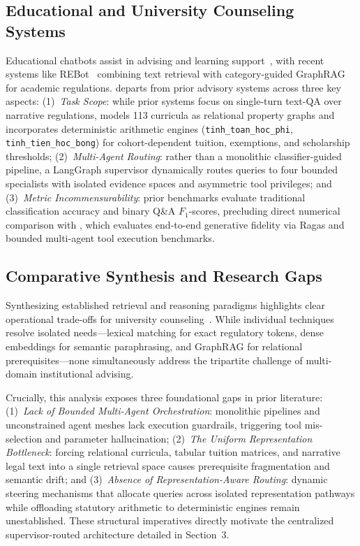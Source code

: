 \subsection{Educational and University Counseling Systems}
\label{sec:educational_counseling}

Educational chatbots assist in advising and learning support~\cite{wollny2021chatbots}, with recent systems like REBot~\cite{ma2025rebot} combining text retrieval with category-guided GraphRAG for academic regulations. \system{} departs from prior advisory systems across three key aspects: (1)~\emph{Task Scope}: while prior systems focus on single-turn text-QA over narrative regulations, \system{} models 113 curricula as relational property graphs and incorporates deterministic arithmetic engines (\texttt{tinh\_toan\_hoc\_phi}, \texttt{tinh\_tien\_hoc\_bong}) for cohort-dependent tuition, exemptions, and scholarship thresholds; (2)~\emph{Multi-Agent Routing}: rather than a monolithic classifier-guided pipeline, a LangGraph supervisor dynamically routes queries to four bounded specialists with isolated evidence spaces and asymmetric tool privileges; and (3)~\emph{Metric Incommensurability}: prior benchmarks evaluate traditional classification accuracy and binary Q\&A $F_1$-scores, precluding direct numerical comparison with \system{}, which evaluates end-to-end generative fidelity via Ragas and bounded multi-agent tool execution benchmarks.

\subsection{Comparative Synthesis and Research Gaps}
\label{sec:gaps}

Synthesizing established retrieval and reasoning paradigms highlights clear operational trade-offs for university counseling~\cite{cormack2009rrf,edge2024graphrag,jeong2024adaptiverag,karpukhin2020dpr,robertson2009bm25,schick2023toolformer,wu2023autogen,yao2023react}. While individual techniques resolve isolated needs---lexical matching for exact regulatory tokens, dense embeddings for semantic paraphrasing, and GraphRAG for relational prerequisites---none simultaneously address the tripartite challenge of multi-domain institutional advising. 

Crucially, this analysis exposes three foundational gaps in prior literature: (1)~\emph{Lack of Bounded Multi-Agent Orchestration}: monolithic pipelines and unconstrained agent meshes lack execution guardrails, triggering tool mis-selection and parameter hallucination; (2)~\emph{The Uniform Representation Bottleneck}: forcing relational curricula, tabular tuition matrices, and narrative legal text into a single retrieval space causes prerequisite fragmentation and semantic drift; and (3)~\emph{Absence of Representation-Aware Routing}: dynamic steering mechanisms that allocate queries across isolated representation pathways while offloading statutory arithmetic to deterministic engines remain unestablished. These structural imperatives directly motivate the centralized supervisor-routed architecture detailed in Section~3.
